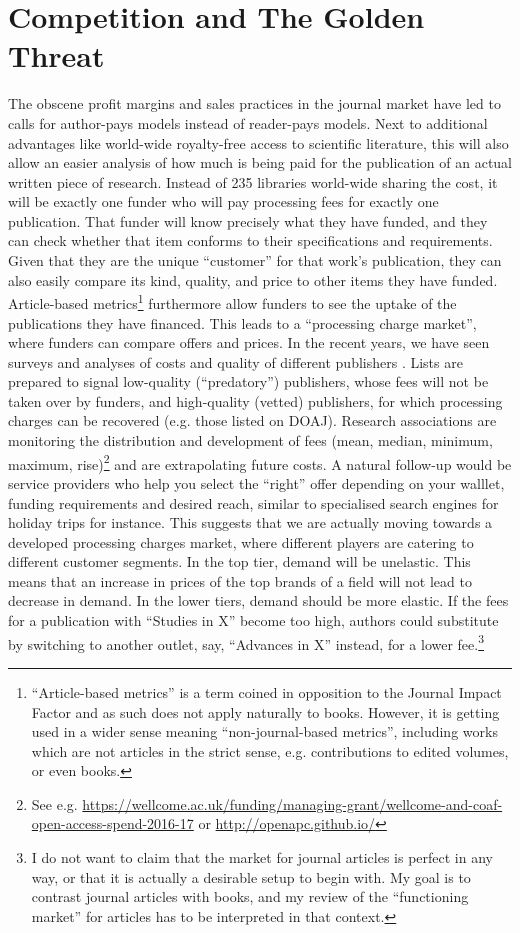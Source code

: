 \documentclass[12pt]{article}
\begin{document}
\section{Competition and The Golden Threat}\label{sec:goldenthreat}
The obscene profit margins and sales practices in the journal market have led to calls for author-pays models instead of reader-pays models. Next to additional advantages like world-wide royalty-free access to scientific literature, this will also allow an easier analysis of how much is being paid for the publication of an actual written piece of research. Instead of 235 libraries world-wide sharing the cost, it will be exactly one funder who will pay processing fees for exactly one publication. That funder will know precisely what they have funded, and they can check whether that item conforms to their specifications and requirements. Given that they are the unique ``customer'' for that work's publication, they can also easily compare its kind, quality, and price to other items they have funded. Article-based metrics\footnote{``Article-based metrics''
 is a term coined in opposition to the Journal Impact Factor and as such does not apply naturally to books. However, it is getting used in a wider sense meaning ``non-journal-based metrics'', including works which are not articles in the strict sense, e.g. contributions to edited volumes, or even books.
 } furthermore allow funders to see the uptake of the publications they have financed. This leads to a ``processing charge market'', where funders can compare offers and prices. In the recent years, we have seen surveys and analyses of costs and quality of different publishers \citep{SchimmerEtAl2015}. Lists are prepared to signal low-quality (``predatory'') publishers, whose fees will not be taken over by funders,  and high-quality (vetted) publishers, for which processing charges can be recovered (e.g. those listed on DOAJ). Research associations are monitoring the distribution and development of fees (mean, median, minimum, maximum, rise)\footnote{See e.g. \url{https://wellcome.ac.uk/funding/managing-grant/wellcome-and-coaf-open-access-spend-2016-17} or \url{http://openapc.github.io/}}
 and are extrapolating future costs. A natural follow-up would be service providers who help you select the ``right'' offer depending on your walllet, funding requirements and desired reach, similar to specialised search engines for holiday trips for instance. This suggests that we are actually moving towards a developed processing charges market, where different players are catering to different customer segments. In the top tier, demand will be unelastic. This means that an increase in prices of the top brands of a field will not lead to decrease in demand.  In the lower tiers, demand should be more elastic. If the fees for a publication with ``Studies in X'' become too high, authors could substitute by switching to another outlet, say, ``Advances in X'' instead, for a lower fee.\footnote{I do not want to claim that the market for journal articles is perfect in any way, or that it is actually a desirable setup to begin with. My goal is to contrast journal articles with books, and my review of the ``functioning market'' for articles has to be interpreted in that context.} 
 
\end{document}
